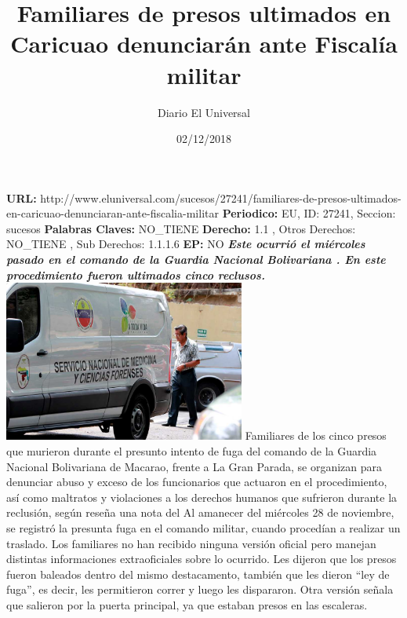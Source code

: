 \documentclass{article}%
\title{\textbf{Familiares de presos ultimados en Caricuao denunciarán ante Fiscalía militar}}%
\author{Diario El Universal}%
\date{02/12/2018}%
\begin{document}
%
\normalsize%
\maketitle%
\textbf{URL: }%
http://www.eluniversal.com/sucesos/27241/familiares{-}de{-}presos{-}ultimados{-}en{-}caricuao{-}denunciaran{-}ante{-}fiscalia{-}militar\newline%
%
\textbf{Periodico: }%
EU, %
ID: %
27241, %
Seccion: %
sucesos\newline%
%
\textbf{Palabras Claves: }%
NO\_TIENE\newline%
%
\textbf{Derecho: }%
1.1%
, Otros Derechos: %
NO\_TIENE%
, Sub Derechos: %
1.1.1.6%
\newline%
%
\textbf{EP: }%
NO\newline%
\newline%
%
\textbf{\textit{Este ocurrió el miércoles pasado en el comando de la Guardia Nacional Bolivariana . En este procedimiento fueron ultimados cinco reclusos.}}%
\newline%
\newline%
%
\includegraphics[width=300px]{86.jpg}%
\newline%
%
Familiares de los cinco presos que murieron durante el presunto intento de fuga del comando de la Guardia Nacional Bolivariana de Macarao, frente a La Gran Parada, se organizan para denunciar abuso y exceso de los funcionarios que actuaron en el procedimiento, así como maltratos y violaciones a los derechos humanos que sufrieron durante la reclusión, según reseña una nota del%
\newline%
%
Al amanecer del miércoles 28 de noviembre, se registró la presunta fuga en el comando militar, cuando procedían a realizar un traslado. Los familiares no han recibido ninguna versión oficial pero manejan distintas informaciones extraoficiales sobre lo ocurrido. Les dijeron que los presos fueron baleados dentro del mismo destacamento, también que les dieron “ley de fuga”, es decir, les permitieron correr y luego les dispararon. Otra versión señala que salieron por la puerta principal, ya que estaban presos en las escaleras.%
\end{document}
